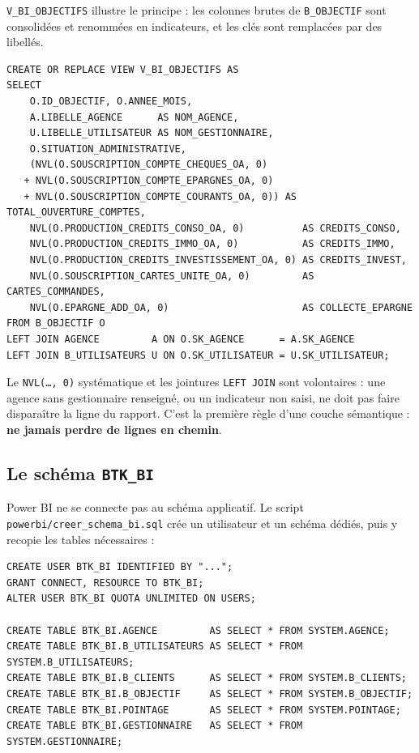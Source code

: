 \vspace{0.6em}
\texttt{V\_BI\_OBJECTIFS} illustre le principe : les colonnes brutes de
\texttt{B\_OBJECTIF} sont consolidées et renommées en indicateurs, et les clés
sont remplacées par des libellés.

\begin{lstlisting}[style=sql]
CREATE OR REPLACE VIEW V_BI_OBJECTIFS AS
SELECT
    O.ID_OBJECTIF, O.ANNEE_MOIS,
    A.LIBELLE_AGENCE      AS NOM_AGENCE,
    U.LIBELLE_UTILISATEUR AS NOM_GESTIONNAIRE,
    O.SITUATION_ADMINISTRATIVE,
    (NVL(O.SOUSCRIPTION_COMPTE_CHEQUES_OA, 0)
   + NVL(O.SOUSCRIPTION_COMPTE_EPARGNES_OA, 0)
   + NVL(O.SOUSCRIPTION_COMPTE_COURANTS_OA, 0)) AS TOTAL_OUVERTURE_COMPTES,
    NVL(O.PRODUCTION_CREDITS_CONSO_OA, 0)          AS CREDITS_CONSO,
    NVL(O.PRODUCTION_CREDITS_IMMO_OA, 0)           AS CREDITS_IMMO,
    NVL(O.PRODUCTION_CREDITS_INVESTISSEMENT_OA, 0) AS CREDITS_INVEST,
    NVL(O.SOUSCRIPTION_CARTES_UNITE_OA, 0)         AS CARTES_COMMANDES,
    NVL(O.EPARGNE_ADD_OA, 0)                       AS COLLECTE_EPARGNE
FROM B_OBJECTIF O
LEFT JOIN AGENCE         A ON O.SK_AGENCE      = A.SK_AGENCE
LEFT JOIN B_UTILISATEURS U ON O.SK_UTILISATEUR = U.SK_UTILISATEUR;
\end{lstlisting}

\begin{retenir}
Le \texttt{NVL(\dots, 0)} systématique et les jointures \texttt{LEFT JOIN} sont
volontaires : une agence sans gestionnaire renseigné, ou un indicateur non
saisi, ne doit pas faire disparaître la ligne du rapport. C'est la première
règle d'une couche sémantique : \textbf{ne jamais perdre de lignes en chemin}.
\end{retenir}

\subsection{Le schéma \texttt{BTK\_BI}}

Power BI ne se connecte pas au schéma applicatif. Le script
\texttt{powerbi/creer\_schema\_bi.sql} crée un utilisateur et un schéma dédiés,
puis y recopie les tables nécessaires :

\begin{lstlisting}[style=sql]
CREATE USER BTK_BI IDENTIFIED BY "...";
GRANT CONNECT, RESOURCE TO BTK_BI;
ALTER USER BTK_BI QUOTA UNLIMITED ON USERS;

CREATE TABLE BTK_BI.AGENCE         AS SELECT * FROM SYSTEM.AGENCE;
CREATE TABLE BTK_BI.B_UTILISATEURS AS SELECT * FROM SYSTEM.B_UTILISATEURS;
CREATE TABLE BTK_BI.B_CLIENTS      AS SELECT * FROM SYSTEM.B_CLIENTS;
CREATE TABLE BTK_BI.B_OBJECTIF     AS SELECT * FROM SYSTEM.B_OBJECTIF;
CREATE TABLE BTK_BI.POINTAGE       AS SELECT * FROM SYSTEM.POINTAGE;
CREATE TABLE BTK_BI.GESTIONNAIRE   AS SELECT * FROM SYSTEM.GESTIONNAIRE;
\end{lstlisting}

